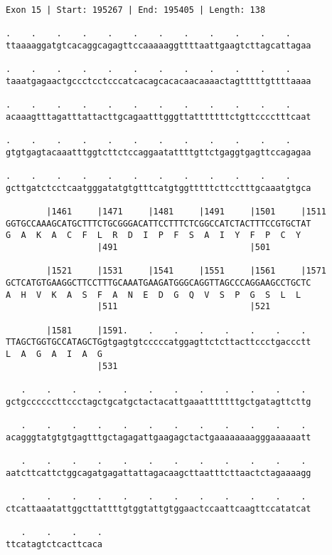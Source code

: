 \documentclass{article}
\begin{document}
\begin{Verbatim}[fontfamily=courier]
Exon 15 | Start: 195267 | End: 195405 | Length: 138

.    .    .    .    .    .    .    .    .    .    .    .    
ttaaaaggatgtcacaggcagagttccaaaaaggttttaattgaagtcttagcattagaa

.    .    .    .    .    .    .    .    .    .    .    .    
taaatgagaactgccctcctcccatcacagcacacaacaaaactagtttttgttttaaaa

.    .    .    .    .    .    .    .    .    .    .    .    
acaaagtttagatttattacttgcagaatttgggttatttttttctgttcccctttcaat

.    .    .    .    .    .    .    .    .    .    .    .    
gtgtgagtacaaatttggtcttctccaggaatattttgttctgaggtgagttccagagaa

.    .    .    .    .    .    .    .    .    .    .    .    
gcttgatctcctcaatgggatatgtgtttcatgtggtttttcttcctttgcaaatgtgca

        |1461     |1471     |1481     |1491     |1501     |1511
GGTGCCAAAGCATGCTTTCTGCGGGACATTCCTTTCTCGGCCATCTACTTTCCGTGCTAT
G  A  K  A  C  F  L  R  D  I  P  F  S  A  I  Y  F  P  C  Y  
                  |491                          |501        

        |1521     |1531     |1541     |1551     |1561     |1571
GCTCATGTGAAGGCTTCCTTTGCAAATGAAGATGGGCAGGTTAGCCCAGGAAGCCTGCTC
A  H  V  K  A  S  F  A  N  E  D  G  Q  V  S  P  G  S  L  L  
                  |511                          |521        

        |1581     |1591.    .    .    .    .    .    .    . 
TTAGCTGGTGCCATAGCTGgtgagtgtcccccatggagttctcttacttccctgaccctt
L  A  G  A  I  A  G                                         
                  |531                                      

   .    .    .    .    .    .    .    .    .    .    .    . 
gctgccccccttccctagctgcatgctactacattgaaatttttttgctgatagttcttg

   .    .    .    .    .    .    .    .    .    .    .    . 
acagggtatgtgtgagtttgctagagattgaagagctactgaaaaaaaagggaaaaaatt

   .    .    .    .    .    .    .    .    .    .    .    . 
aatcttcattctggcagatgagattattagacaagcttaatttcttaactctagaaaagg

   .    .    .    .    .    .    .    .    .    .    .    . 
ctcattaaatattggcttattttgtggtattgtggaactccaattcaagttccatatcat

   .    .    .    .
ttcatagtctcacttcaca
\end{Verbatim}
\newpage
\end{document}
